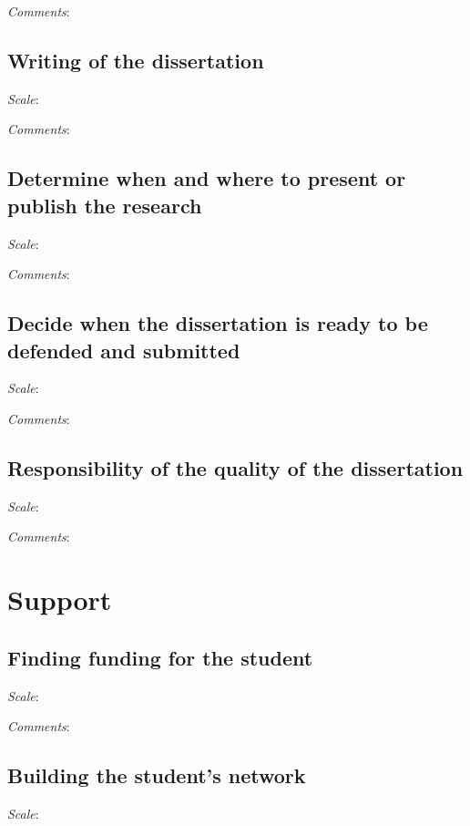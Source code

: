 \documentclass[10pt]{article}
\begin{document}
\textit{Comments}: %

\subsection*{Writing of the dissertation}
\textit{Scale}: %

\textit{Comments}: %

\subsection*{Determine when and where to present or publish the research}
\textit{Scale}: %

\textit{Comments}: %

\subsection*{Decide when the dissertation is ready to be defended and
             submitted}
\textit{Scale}: %

\textit{Comments}: %

\subsection*{Responsibility of the quality of the dissertation}
\textit{Scale}: %

\textit{Comments}: %

\section*{Support}
\subsection*{Finding funding for the student}
\textit{Scale}: %

\textit{Comments}: %

\subsection*{Building the student's network}
\textit{Scale}: %
\end{document}
